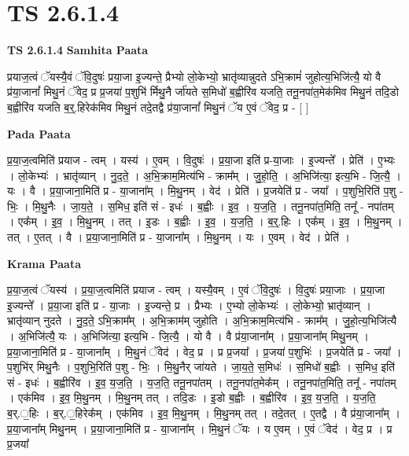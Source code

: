 \documentclass[17pt]{extarticle}
\begin{document}
\section*{ TS 2.6.1.4 }

\textbf{TS 2.6.1.4 } \newline
\textbf{Samhita Paata} \newline

प्रयाज॒त्वं ॅयस्यै॒वं ॅवि॒दुषः॑ प्रया॒जा इ॒ज्यन्ते॒ प्रैभ्यो लो॒केभ्यो॒ भ्रातृ॑व्यान्नुदते ऽभि॒क्रामं॑ जुहोत्य॒भिजि॑त्यै॒ यो वै प्र॑या॒जानां᳚ मिथु॒नं ॅवेद॒ प्र प्र॒जया॑ प॒शुभि॑ र्मिथु॒नै र्जा॑यते स॒मिधो॑ ब॒ह्वीरि॑व यजति॒ तनू॒नपा॑त॒मेक॑मिव मिथु॒नं तदि॒डो ब॒ह्वीरि॑व यजति ब॒र्॒.हिरेक॑मिव मिथु॒नं तदे॒तद्वै प्र॑या॒जानां᳚ मिथु॒नं ॅय ए॒वं ॅवेद॒ प्र - [  ] \newline

\textbf{Pada Paata} \newline

प्र॒या॒ज॒त्वमिति॑ प्रयाज - त्वम् । यस्य॑ । ए॒वम् । वि॒दुषः॑ । प्र॒या॒जा इति॑ प्र-या॒जाः । इ॒ज्यन्ते᳚ । प्रेति॑ । ए॒भ्यः । लो॒केभ्यः॑ । भ्रातृ॑व्यान् । नु॒द॒ते॒ । अ॒भि॒क्राम॒मित्य॑भि - क्राम᳚म् । जु॒हो॒ति॒ । अ॒भिजि॑त्या॒ इत्य॒भि - जि॒त्यै॒ । यः । वै । प्र॒या॒जाना॒मिति॑ प्र - या॒जाना᳚म् । मि॒थु॒नम् । वेद॑ । प्रेति॑ । प्र॒जयेति॑ प्र - जया᳚ । प॒शुभि॒रिति॑ प॒शु - भिः॒ । मि॒थु॒नैः । जा॒य॒ते॒ । स॒मिध॒ इति॑ सं - इधः॑ । ब॒ह्वीः । इ॒व॒ । य॒ज॒ति॒ । तनू॒नपा॑त॒मिति॒ तनू᳚ - नपा॑तम् । एक᳚म् । इ॒व॒ । मि॒थु॒नम् । तत् । इ॒डः । ब॒ह्वीः । इ॒व॒ । य॒ज॒ति॒ । ब॒र्॒.हिः । एक᳚म् । इ॒व॒ । मि॒थु॒नम् । तत् । ए॒तत् । वै । प्र॒या॒जाना॒मिति॑ प्र - या॒जाना᳚म् । मि॒थु॒नम् । यः । ए॒वम् । वेद॑ । प्रेति॑ ।  \newline


\textbf{Krama Paata} \newline

प्र॒या॒ज॒त्वं ॅयस्य॑ । प्र॒या॒ज॒त्वमिति॑ प्रयाज - त्वम् । यस्यै॒वम् । ए॒वं ॅवि॒दुषः॑ । वि॒दुषः॑ प्रया॒जाः । प्र॒या॒जा इ॒ज्यन्ते᳚ । प्र॒या॒जा इति॑ प्र - या॒जाः । इ॒ज्यन्ते॒ प्र । प्रैभ्यः । ए॒भ्यो लो॒केभ्यः॑ । लो॒केभ्यो॒ भ्रातृ॑व्यान् । भ्रातृ॑व्यान् नुदते । नु॒द॒ते॒ ऽभि॒क्राम᳚म् । अ॒भि॒क्राम॑म् जुहोति । अ॒भि॒क्राम॒मित्य॑भि - क्राम᳚म् । जु॒हो॒त्य॒भिजि॑त्यै । अ॒भिजि॑त्यै॒ यः । अ॒भिजि॑त्या॒ इत्य॒भि - जि॒त्यै॒ । यो वै । वै प्र॑या॒जाना᳚म् । प्र॒या॒जाना᳚म् मिथु॒नम् । प्र॒या॒जाना॒मिति॑ प्र - या॒जाना᳚म् । मि॒थु॒नं ॅवेद॑ । वेद॒ प्र । प्र प्र॒जया᳚ । प्र॒जया॑ प॒शुभिः॑ । प्र॒जयेति॑ प्र - जया᳚ । प॒शुभि॑र् मिथु॒नैः । प॒शुभि॒रिति॑ प॒शु - भिः॒ । मि॒थु॒नैर् जा॑यते । जा॒य॒ते॒ स॒मिधः॑ । स॒मिधो॑ ब॒ह्वीः । स॒मिध॒ इति॑ सं - इधः॑ । ब॒ह्वीरि॑व । इ॒व॒ य॒ज॒ति॒ । य॒ज॒ति॒ तनू॒नपा॑तम् । तनू॒नपा॑त॒मेक᳚म् । तनू॒नपा॑त॒मिति॒ तनू᳚ - नपा॑तम् । एक॑मिव । इ॒व॒ मि॒थु॒नम् । मि॒थु॒नम् तत् । तदि॒डः । इ॒डो ब॒ह्वीः । ब॒ह्वीरि॑व । इ॒व॒ य॒ज॒ति॒ । य॒ज॒ति॒ ब॒र्.॒हिः । ब॒र्.॒हिरेक᳚म् । एक॑मिव । इ॒व॒ मि॒थु॒नम् । मि॒थु॒नम् तत् । तदे॒तत् । ए॒तद्वै । वै प्र॑या॒जाना᳚म् । प्र॒या॒जाना᳚म् मिथु॒नम् । प्र॒या॒जाना॒मिति॑ प्र - या॒जाना᳚म् । मि॒थु॒नं ॅयः । य ए॒वम् । ए॒वं ॅवेद॑ । वेद॒ प्र । प्र प्र॒जया᳚ \newline
\end{document}
